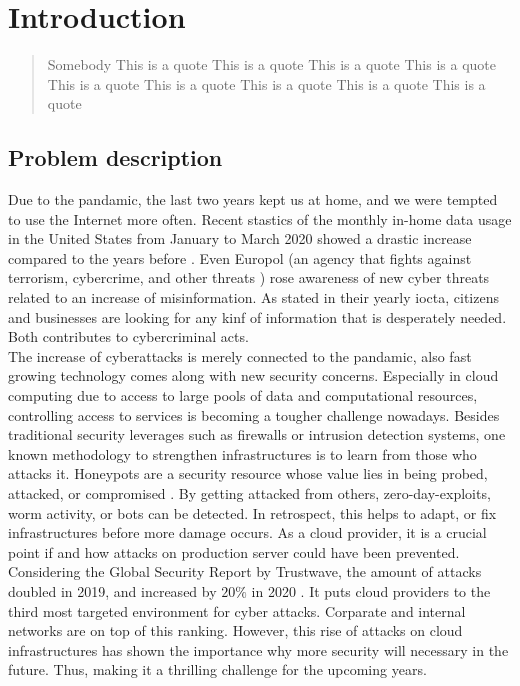\chapter{Introduction}

\begin{quote}{Somebody}
    This is a quote This is a quote This is a quote
    This is a quote This is a quote This is a quote
    This is a quote This is a quote This is a quote
\end{quote}

\section{Problem description}

Due to the pandamic, the last two years kept us at home, and we were tempted to use the Internet more often. Recent stastics of the monthly in-home data usage in the United States from January to March 2020 showed a drastic increase compared to the years before \cite{statista2021}. Even Europol (an agency that fights against terrorism, cybercrime, and other threats \cite{europol2021}) rose awareness of new cyber threats related to an increase of misinformation. As stated in their yearly \ac{iocta}, citizens and businesses are looking for any kinf of information that is desperately needed. Both contributes to cybercriminal acts. \cite{iocta2020}\\


The increase of cyberattacks is merely connected to the pandamic, also fast growing technology comes along with new security concerns. Especially in cloud computing due to access to large pools of data and computational resources, controlling access to services is becoming a tougher challenge nowadays. Besides traditional security leverages such as firewalls or intrusion detection systems, one known methodology to strengthen infrastructures is to learn from those who attacks it. Honeypots are a security resource whose value lies in being probed, attacked, or compromised \cite{Spitzner2003}. By getting attacked from others, zero-day-exploits, worm activity, or bots can be detected. In retrospect, this helps to adapt, or fix infrastructures before more damage occurs. As a cloud provider, it is a crucial point if and how attacks on production server could have been prevented. Considering the Global Security Report by Trustwave, the amount of attacks doubled in 2019, and increased by $20\%$ in 2020 \cite{fahim2020}. It puts cloud providers to the third most targeted environment for cyber attacks. Corparate and internal networks are on top of this ranking. However, this rise of attacks on cloud infrastructures has shown the importance why more security will necessary in the future. Thus, making it a thrilling challenge for the upcoming years.\\

